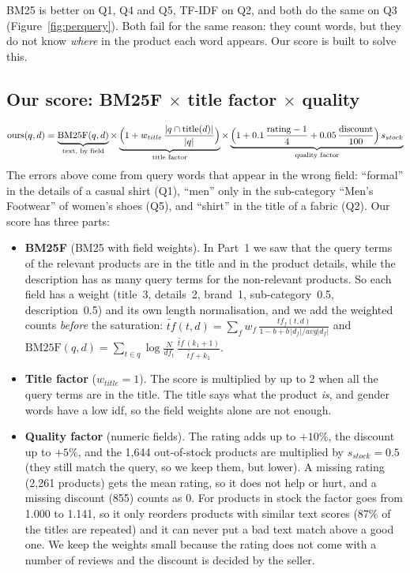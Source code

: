 \documentclass[11pt,a4paper]{article}
\begin{document}
BM25 is better on Q1, Q4 and Q5, TF-IDF on Q2, and both do the same on Q3 (Figure~\ref{fig:perquery}). Both fail for the
same reason: they count words, but they do not know \emph{where} in the product each word appears. Our score is built to
solve this.

\subsection{\texorpdfstring{Our score: BM25F $\times$ title factor $\times$ quality}{Our score: BM25F x title factor x quality}}
\label{sec:ours}
\[
\text{ours}(q,d) = \underbrace{\text{BM25F}(q,d)}_{\text{text, by field}} \times
\underbrace{\Bigl(1 + w_{title}\,\frac{|q \cap \text{title}(d)|}{|q|}\Bigr)}_{\text{title factor}} \times
\underbrace{\Bigl(1 + 0.1\,\frac{\text{rating} - 1}{4} + 0.05\,\frac{\text{discount}}{100}\Bigr)\, s_{stock}}_{\text{quality factor}}
\]
The errors above come from query words that appear in the wrong field: ``formal'' in the details of a casual shirt
(Q1), ``men'' only in the sub-category ``Men's Footwear'' of women's shoes (Q5), and ``shirt'' in the title of a fabric
(Q2). Our score has three parts:

\begin{itemize}
\item \textbf{BM25F} (BM25 with field weights). In Part~1 we saw that the query terms of the relevant products are in the
title and in the product details, while the description has as many query terms for the non-relevant products. So each
field has a weight (title~3, details~2, brand~1, sub-category~0.5, description~0.5) and its own length normalisation,
and we add the weighted counts \emph{before} the saturation:
$\widetilde{tf}(t,d) = \sum_{f} w_f\,\frac{tf_f(t,d)}{1 - b + b\,|d_f| / avg|d_f|}$ and
$\text{BM25F}(q,d) = \sum_{t\in q} \log\frac{N}{df_t}\,\frac{\widetilde{tf}\,(k_1+1)}{\widetilde{tf} + k_1}$.
\item \textbf{Title factor} ($w_{title} = 1$). The score is multiplied by up to 2 when all the query terms are in the
title. The title says what the product \emph{is}, and gender words have a low idf, so the field weights alone are not
enough.
\item \textbf{Quality factor} (numeric fields). The rating adds up to $+10\%$, the discount up to $+5\%$, and the 1,644
out-of-stock products are multiplied by $s_{stock} = 0.5$ (they still match the query, so we keep them, but lower). A
missing rating (2,261 products) gets the mean rating, so it does not help or hurt, and a missing discount (855) counts
as 0. For products in stock the factor goes from 1.000 to 1.141, so it only reorders products with similar text scores
(87\% of the titles are repeated) and it can never put a bad text match above a good one. We keep the weights small
because the rating does not come with a number of reviews and the discount is decided by the seller.
\end{itemize}
\end{document}
